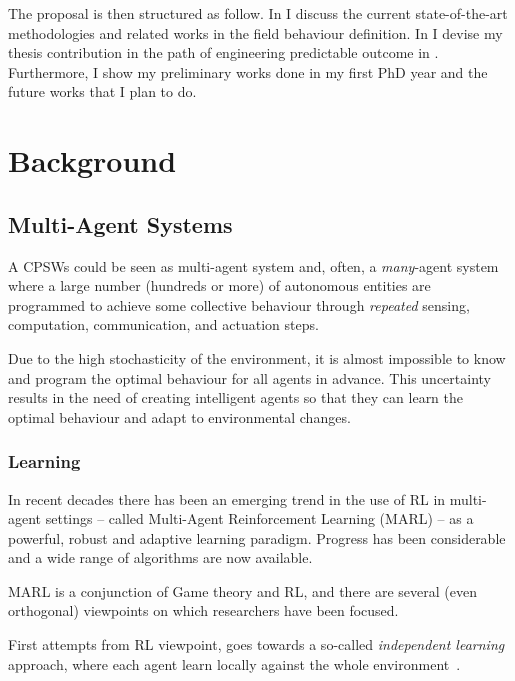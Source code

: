 \documentclass[11pt]{article}
\begin{document}
The proposal is then structured as follow. In  I discuss the current state-of-the-art methodologies and related works in the field \cpws behaviour definition.
%
In  I devise my thesis contribution in the path of engineering predictable outcome in \cpws. Furthermore, I show my preliminary works done in my first PhD year and the future works that I plan to do. 


\section{Background} \label{background}
\subsection{Multi-Agent Systems}
A CPSWs could be seen as multi-agent system and, often, a \emph{many}-agent system where a large number (hundreds or more) of autonomous entities are programmed to achieve some collective behaviour through \emph{repeated}  sensing, computation, communication, and actuation steps.

Due to the high stochasticity of the environment, it is almost impossible to know and program the optimal behaviour for all agents in advance.
%  
This uncertainty results in the need of creating intelligent agents so that they can learn the optimal behaviour and adapt to environmental changes.
\subsubsection{Learning}
In recent decades there has been an emerging trend in the use of RL 
in multi-agent settings -- called Multi-Agent Reinforcement Learning (MARL) -- as a powerful, robust and adaptive learning paradigm.
%
Progress has been considerable and a wide range of algorithms are now available.

MARL is a conjunction of Game theory and RL, 
 and there are several (even orthogonal) viewpoints on which researchers have been focused.

First attempts from RL viewpoint, 
 goes towards a so-called \textit{independent learning}~\cite{DBLP:journals/tsmc/BusoniuBS08} approach, 
 where each agent learn locally against the whole environment~\cite{DBLP:conf/icml/Tan93}.
\end{document}
